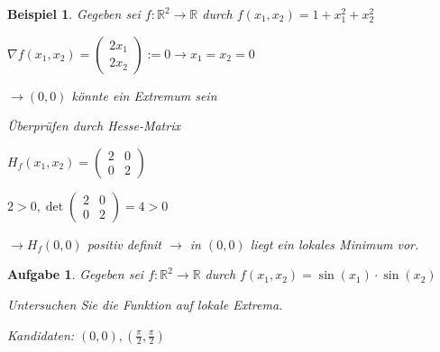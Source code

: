 \documentclass[fontset=ubuntu,12pt,a4paper]{scrreprt}
\newtheorem{beispiel}[defi]{Beispiel}
\newtheorem{aufg}[defi]{Aufgabe}
\begin{document}
\begin{beispiel}
    Gegeben sei \(f:\mathbb{R}^2\to\mathbb{R}\) durch \(f(x_1,x_2)=1+x_1^2+x_2^2\)
    
    \(\nabla f(x_1,x_2)=\begin{pmatrix}
    2x_1 \\ 2x_2
    \end{pmatrix} := 0 \to x_1=x_2=0\)
    
    \(\to (0,0)\) könnte ein Extremum sein
    
    Überprüfen durch Hesse-Matrix

    \(H_f(x_1,x_2)=\begin{pmatrix}
    2 & 0 \\ 0 & 2
    \end{pmatrix}\)

    \(2>0, \det\begin{pmatrix}
    2 & 0 \\ 0 & 2
    \end{pmatrix}=4>0\)
    
    \(\to H_f(0,0)\) positiv definit \(\to\) in \((0,0)\) liegt ein lokales Minimum vor.
\end{beispiel}

\begin{aufg}
    Gegeben sei \(f:\mathbb{R}^2\to\mathbb{R}\) durch \(f(x_1,x_2)=\sin(x_1)\cdot\sin(x_2)\)
    
    Untersuchen Sie die Funktion auf lokale Extrema.
    
    Kandidaten: \((0,0),\left(\frac{\pi}{2},\frac{\pi}{2}\right)\)
\end{aufg}
\end{document}
